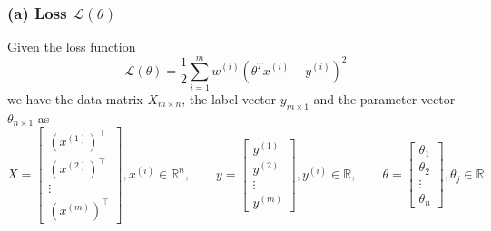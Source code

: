 \subsubsection*{(a) Loss \( \mathcal{L}(\theta) \)}

Given the loss function
\begin{equation*}
    \mathcal{L}(\theta)
    =
    \frac{1}{2}
    \sum_{i=1}^{m}
    w^{(i)}{\left(\theta^{T} x^{(i)}-y^{(i)}\right)}^{2}
\end{equation*}
we have the data matrix \( X_{m \times n} \), the label vector \( y_{m \times 1} \) and the parameter vector \( \theta_{n \times 1} \) as
\begin{equation*}
    X
    =
    \begin{bmatrix}
        {\left(x^{(1)}\right)}^\top \\
        {\left(x^{(2)}\right)}^\top \\
        \vdots                      \\
        {\left(x^{(m)}\right)}^\top
    \end{bmatrix}
    , x^{(i)} \in \mathbb{R}^{n}
    , \qquad
    y
    =
    \begin{bmatrix}
        y^{(1)} \\
        y^{(2)} \\
        \vdots  \\
        y^{(m)}
    \end{bmatrix}
    , y^{(i)} \in \mathbb{R}
    , \qquad
    \theta
    =
    \begin{bmatrix}
        \theta_{1} \\
        \theta_{2} \\
        \vdots     \\
        \theta_{n}
    \end{bmatrix}
    , \theta_{j} \in \mathbb{R}
\end{equation*}

